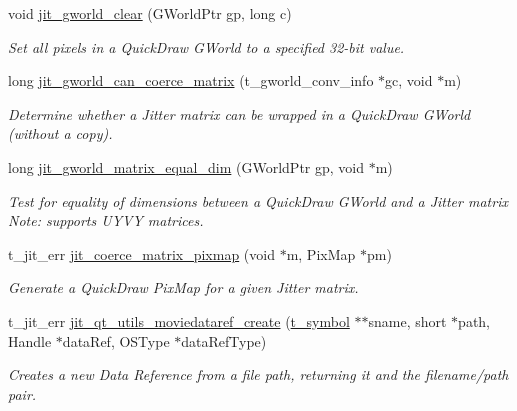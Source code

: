 \begin{DoxyCompactItemize}
\item 
void \hyperlink{group__qtutilsmod_ga368de0a058f98dbfcf8259528f1daa39}{jit\_\-gworld\_\-clear} (GWorldPtr gp, long c)
\begin{DoxyCompactList}\small\item\em Set all pixels in a QuickDraw GWorld to a specified 32-\/bit value. \item\end{DoxyCompactList}\item 
long \hyperlink{group__qtutilsmod_gae02418456d361112ae3d1d6ac40a58e8}{jit\_\-gworld\_\-can\_\-coerce\_\-matrix} (t\_\-gworld\_\-conv\_\-info $\ast$gc, void $\ast$m)
\begin{DoxyCompactList}\small\item\em Determine whether a Jitter matrix can be wrapped in a QuickDraw GWorld (without a copy). \item\end{DoxyCompactList}\item 
long \hyperlink{group__qtutilsmod_ga96b18f81671878671095be4b05443b11}{jit\_\-gworld\_\-matrix\_\-equal\_\-dim} (GWorldPtr gp, void $\ast$m)
\begin{DoxyCompactList}\small\item\em Test for equality of dimensions between a QuickDraw GWorld and a Jitter matrix Note: supports UYVY matrices. \item\end{DoxyCompactList}\item 
t\_\-jit\_\-err \hyperlink{group__qtutilsmod_gaaead101760e06f6c88cedc03db7f4b64}{jit\_\-coerce\_\-matrix\_\-pixmap} (void $\ast$m, PixMap $\ast$pm)
\begin{DoxyCompactList}\small\item\em Generate a QuickDraw PixMap for a given Jitter matrix. \item\end{DoxyCompactList}\item 
t\_\-jit\_\-err \hyperlink{group__qtutilsmod_ga3a890ee4b21dcc12fd498103c0064025}{jit\_\-qt\_\-utils\_\-moviedataref\_\-create} (\hyperlink{structt__symbol}{t\_\-symbol} $\ast$$\ast$sname, short $\ast$path, Handle $\ast$dataRef, OSType $\ast$dataRefType)
\begin{DoxyCompactList}\small\item\em Creates a new Data Reference from a file path, returning it and the filename/path pair. \item\end{DoxyCompactList}\item 
$$
\end{DoxyCompactItemize}
